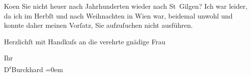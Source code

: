 \pstart
           Ko{\geminationm}en Sie nicht heuer nach Jahrhunderten wieder nach St Gilgen? Ich war leider, da ich im Herbſt und
               nach Weihnachten in Wien war, beidemal unwohl und
               konnte daher meinen Vorſatz, Sie aufzuſuchen nicht ausführen.\pend
           
\pstart
           Herzlichſt mit Handkuſs an die verehrte gnädige Frau\pend
           
\pstart
           Ihr{\\[\baselineskip]}\spacefill\mbox{D\textsuperscript{r}Burckhard}\pend
           \leftskip=0em{}\endnumbering{}  \newcommand{\dateiname}{L01774}\newcommand{\titel}{Max Burckhard an Arthur Schnitzler, 7. 6. 1908}\newcommand{\editorInnen}{Martin Anton Müller und Gerd-Hermann Susen}
